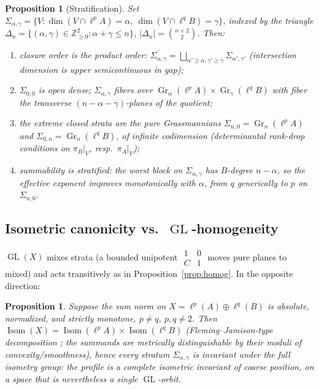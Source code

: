 \documentclass[11pt]{amsart}
\newtheorem{proposition}[theorem]{Proposition}
\theoremstyle{definition}
\newcommand{\Z}{\mathbb{Z}}
\newcommand{\Gr}{\operatorname{Gr}}
\newcommand{\Isom}{\operatorname{Isom}}
\newcommand{\GL}{\operatorname{GL}}
\begin{document}
\begin{proposition}[Stratification]\label{prop:strata}
Set $\Sigma_{\alpha,\gamma}=\{V:\dim(V\cap\ell^pA)=\alpha,\ \dim(V\cap\ell^qB)=\gamma\}$, indexed by the triangle $\Delta_n=\{(\alpha,\gamma)\in\Z_{\ge0}^2:\alpha+\gamma\le n\}$, $|\Delta_n|=\binom{n+2}{2}$. Then:
\begin{enumerate}[label=\textup{(\alph*)}]
\item closure order is the product order: $\overline{\Sigma_{\alpha,\gamma}}=\bigsqcup_{\alpha'\ge\alpha,\gamma'\ge\gamma}\Sigma_{\alpha',\gamma'}$ \textup{(}intersection dimension is upper semicontinuous in gap\textup{)};
\item $\Sigma_{0,0}$ is open dense; $\Sigma_{\alpha,\gamma}$ fibers over $\Gr_\alpha(\ell^pA)\times\Gr_\gamma(\ell^qB)$ with fiber the transverse $(n-\alpha-\gamma)$-planes of the quotient;
\item the extreme closed strata are the pure Grassmannians $\Sigma_{n,0}=\Gr_n(\ell^pA)$ and $\Sigma_{0,n}=\Gr_n(\ell^qB)$, of infinite codimension \textup{(}determinantal rank-drop conditions on $\pi_B|_V$, resp.\ $\pi_A|_V$\textup{)};
\item summability is stratified: the worst block on $\Sigma_{\alpha,\gamma}$ has $B$-degree $n-\alpha$, so the effective exponent improves monotonically with $\alpha$, from $q$ generically to $p$ on $\Sigma_{n,0}$.
\end{enumerate}
\end{proposition}

\subsection{Isometric canonicity vs.\ $\GL$-homogeneity}\label{ssec:isom}

$\GL(X)$ mixes strata (a bounded unipotent $\begin{smallmatrix}1&0\\ C&1\end{smallmatrix}$ moves pure planes to mixed) and acts transitively as in Proposition~\ref{prop:homog}. In the opposite direction:

\begin{proposition}\label{prop:isomcan}
Suppose the sum norm on $X=\ell^p(A)\oplus\ell^q(B)$ is absolute, normalized, and strictly monotone, $p\ne q$, $p,q\ne2$. Then $\Isom(X)=\Isom(\ell^pA)\times\Isom(\ell^qB)$ \textup{(}Fleming--Jamison-type decomposition \cite{FJ}; the summands are metrically distinguishable by their moduli of convexity/smoothness\textup{)}, hence every stratum $\Sigma_{\alpha,\gamma}$ is invariant under the full isometry group: the profile is a complete isometric invariant of coarse position, on a space that is nevertheless a single $\GL$-orbit.
\end{proposition}
\end{document}
